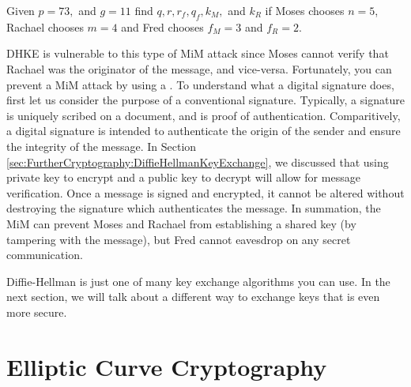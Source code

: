 \begin{exercise}{}
Given $p=73,$ and $g=11$ find $q, r, r_f, q_f, k_M,$ and $k_R$ if Moses chooses $n=5$, Rachael chooses $m=4$ and Fred chooses $f_M=3$ and $f_R=2$.
\end{exercise}

DHKE is vulnerable to this type of MiM attack since Moses cannot verify that Rachael was the originator of the message, and vice-versa.  Fortunately, you can prevent a MiM attack by using a .  To understand what a digital signature does, first let us consider the purpose of a conventional signature.  Typically, a signature is uniquely scribed on a document, and is proof of authentication.  Comparitively, a digital signature is intended to authenticate the origin of the sender and ensure the integrity of the message.  In Section \ref{sec:FurtherCryptography:DiffieHellmanKeyExchange}, we discussed that using private key to encrypt and a public key to decrypt will allow for message verification.  Once a message is signed and encrypted, it cannot be altered without destroying the signature which authenticates the message. In summation, the MiM can prevent Moses and Rachael from establishing a shared key (by tampering with the message), but Fred cannot eavesdrop on any secret communication.

 Diffie-Hellman is just one of many key exchange algorithms you can use. In the next section, we will talk about a different way to exchange keys that is even more secure.

\section{Elliptic Curve Cryptography}\label{sec:FurtherTopicsCryptographyECC2}

